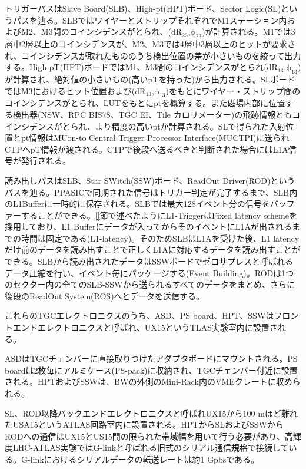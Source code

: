 トリガーパスはSlave Board(SLB)、High-pt(HPT)ボード、Sector Logic(SL)というパスを辿る。SLBではワイヤーとストリップそれぞれでM1ステーション内およびM2、M3間のコインシデンスがとられ、($\mathrm{dR_{23}}$,$\mathrm{\phi_{23}}$)が計算される。M1では3層中2層以上のコインシデンスが、M2、M3では4層中3層以上のヒットが要求され、コインシデンスが取れたもののうち検出位置の差が小さいものを絞って出力する。High-pT(HPT)ボードではM1、M3間のコインシデンスがとられ($\mathrm{dR_{13}}$,$\mathrm{\phi_{13}}$)が計算され、絶対値の小さいもの(高いpTを持った)から出力される。SLボードではM3におけるヒット位置および($\mathrm{dR_{13}}$,$\mathrm{\phi_{13}}$)をもとにワイヤー・ストリップ間のコインシデンスがとられ、LUTをもとにptを概算する。また磁場内部に位置する検出器(NSW、RPC BIS78、TGC EI、Tile カロリメーター)の飛跡情報ともコインシデンスがとられ、より精度の高いptが計算される。SLで得られた入射位置とpt情報はMUon-to Central Trigger Processor Interface(MUCTPI)に送られCTPへpT情報が渡される。CTPで後段へ送るべきと判断された場合にはL1A信号が発行される。

読み出しパスはSLB、Star SWitch(SSW)ボード、ReadOut Driver(ROD)というパスを辿る。PPASICで同期された信号はトリガー判定が完了するまで、SLB内のL1Bufferに一時的に保存される。SLBでは最大128イベント分の信号をバッファーすることができる。\ref{}節で述べたようにL1-TriggerはFixed latency schemeを採用しており、L1 Bufferにデータが入ってからそのイベントにL1Aが出されるまでの時間は固定である(L1-latency)。そのためSLBはL1Aを受けた後、L1 latencyだけ前のデータを読み出すことで正しくL1Aに対応するデータを読み出すことができる。SLBから読み出されたデータはSSWボードでゼロサプレスと呼ばれるデータ圧縮を行い、イベント毎にパッケージする(Event Building)。RODは1つのセクター内の全てのSLB-SSWから送られるすべてのデータをまとめ、さらに後段のReadOut System(ROS)へとデータを送信する。

これらのTGCエレクトロニクスのうち、ASD、PS board、HPT、SSWはフロントエンドエレクトロニクスと呼ばれ、UX15というTLAS実験室内に設置される。

ASDはTGCチェンバーに直接取りつけたアダプタボードにマウントされる。PS boardは2枚毎にアルミケース(PS-pack)に収納され、TGCチェンバー付近に設置される。HPTおよびSSWは、BWの外側のMini-Rack内のVMEクレートに収められる。

SL、ROD以降バックエンドエレクトロニクスと呼ばれUX15から100 mほど離れたUSA15というATLAS回路室内に設置される。HPTからSLおよびSSWからRODへの通信はUX15とUS15間の限られた帯域幅を用いて行う必要があり、高輝度LHC-ATLAS実験ではG-linkと呼ばれる旧式のシリアル通信規格で接続している。G-linkにおけるシリアルデータの転送レートは約1 Gpbsである。

